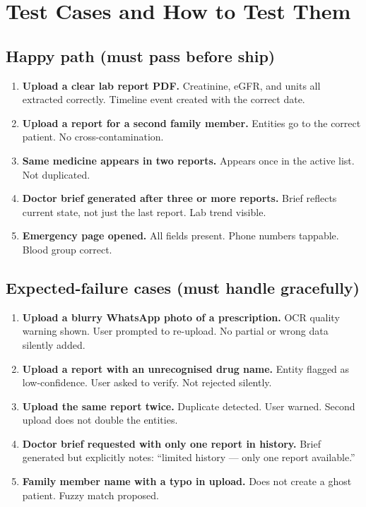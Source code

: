 \documentclass[11pt, a4paper]{article}
\begin{document}
\section{Test Cases and How to Test Them}

\subsection{Happy path (must pass before ship)}

\begin{enumerate}
  \item \textbf{Upload a clear lab report PDF.} Creatinine, eGFR, and units all extracted correctly. Timeline event created with the correct date.
  \item \textbf{Upload a report for a second family member.} Entities go to the correct patient. No cross-contamination.
  \item \textbf{Same medicine appears in two reports.} Appears once in the active list. Not duplicated.
  \item \textbf{Doctor brief generated after three or more reports.} Brief reflects current state, not just the last report. Lab trend visible.
  \item \textbf{Emergency page opened.} All fields present. Phone numbers tappable. Blood group correct.
\end{enumerate}

\subsection{Expected-failure cases (must handle gracefully)}

\begin{enumerate}
  \item \textbf{Upload a blurry WhatsApp photo of a prescription.} OCR quality warning shown. User prompted to re-upload. No partial or wrong data silently added.
  \item \textbf{Upload a report with an unrecognised drug name.} Entity flagged as low-confidence. User asked to verify. Not rejected silently.
  \item \textbf{Upload the same report twice.} Duplicate detected. User warned. Second upload does not double the entities.
  \item \textbf{Doctor brief requested with only one report in history.} Brief generated but explicitly notes: ``limited history --- only one report available.''
  \item \textbf{Family member name with a typo in upload.} Does not create a ghost patient. Fuzzy match proposed.
\end{enumerate}
\end{document}
